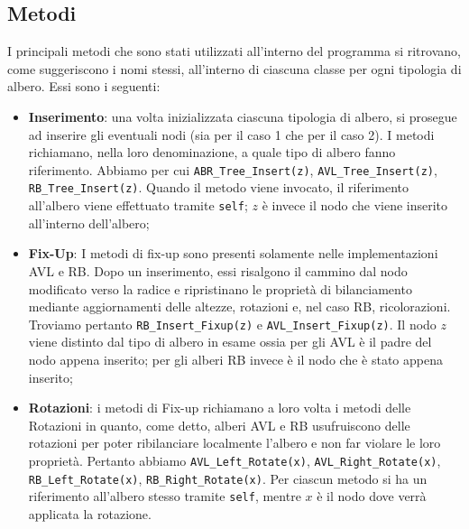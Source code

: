 \subsection{Metodi}
I principali metodi che sono stati utilizzati all'interno del programma si ritrovano, come suggeriscono i nomi stessi, all'interno di ciascuna classe per ogni tipologia di albero. Essi sono i seguenti:
\begin{itemize}
	\item \textbf{Inserimento}: una volta inizializzata ciascuna tipologia di albero, si prosegue ad inserire gli eventuali nodi (sia per il caso 1 che per il caso 2). I metodi richiamano, nella loro denominazione, a quale tipo di albero fanno riferimento. Abbiamo per cui \texttt{ABR\_Tree\_Insert(z)}, \texttt{AVL\_Tree\_Insert(z)}, \texttt{RB\_Tree\_Insert(z)}. Quando il metodo viene invocato, il riferimento all'albero viene effettuato tramite \texttt{self}; $z$ è invece il nodo che viene inserito all'interno dell'albero;
	\item \textbf{Fix-Up}: I metodi di fix-up sono presenti solamente nelle implementazioni AVL e RB. Dopo un inserimento, essi risalgono il cammino dal nodo modificato verso la radice e ripristinano le proprietà di bilanciamento mediante aggiornamenti delle altezze, rotazioni e, nel caso RB, ricolorazioni. Troviamo pertanto \texttt{RB\_Insert\_Fixup(z)} e \texttt{AVL\_Insert\_Fixup(z)}. Il nodo $z$ viene distinto dal tipo di albero in esame ossia per gli AVL è il padre del nodo appena inserito; per gli alberi RB invece è il nodo che è stato appena inserito;
	\item \textbf{Rotazioni}: i metodi di Fix-up richiamano a loro volta i metodi delle Rotazioni in quanto, come detto, alberi AVL e RB usufruiscono delle rotazioni per poter ribilanciare localmente l'albero e non far violare le loro proprietà. Pertanto abbiamo \texttt{AVL\_Left\_Rotate(x)}, \texttt{AVL\_Right\_Rotate(x)}, \texttt{RB\_Left\_Rotate(x)}, \texttt{RB\_Right\_Rotate(x)}. Per ciascun metodo si ha un riferimento all'albero stesso tramite \texttt{self}, mentre $x$ è il nodo dove verrà applicata la rotazione.
\end{itemize}
